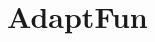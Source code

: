\documentclass[a4paper,11pt]{article}
\newcommand{\THESYSTEM}{\textsf{AdaptFun}}
\begin{document}



\section{\THESYSTEM}
\end{document}
